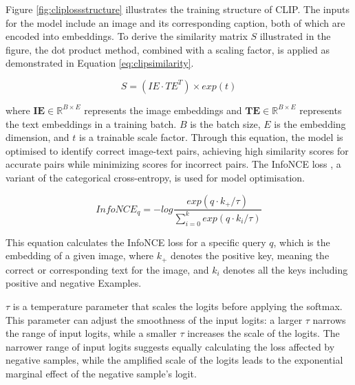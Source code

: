 Figure \ref{fig:cliplossstructure} illustrates the training structure of CLIP. The inputs for the model include an image and its corresponding caption, both of which are encoded into embeddings. To derive the similarity matrix $S$ illustrated in the figure, the dot product method, combined with a scaling factor, is applied as demonstrated in Equation \ref{eq:clipsimilarity}. 

\begin{equation}
    \label{eq:clipsimilarity}
    S = (IE \cdot TE^T) \times exp(t)
\end{equation}

where $\mathbf{IE} \in \mathbb{R}^{B \times E}$ represents the image embeddings and $\mathbf{TE} \in \mathbb{R}^{B \times E}$ represents the text embeddings in a training batch. $B$ is the batch size, $E$ is the embedding dimension, and $t$ is a trainable scale factor. Through this equation, the model is optimised to identify correct image-text pairs, achieving high similarity scores for accurate pairs while minimizing scores for incorrect pairs. The InfoNCE loss \parencite{oord2019representation}, a variant of the categorical cross-entropy, is used for model optimisation.

\begin{equation}
    \label{eq:infonce}
    InfoNCE_q = -log \frac{exp(q \cdot k_+ / \tau)}{\sum_{i=0}^{k}{exp(q \cdot k_i / \tau)}}
\end{equation}

This equation calculates the InfoNCE loss for a specific query $q$, which is the embedding of a given image, where $k_+$ denotes the positive key, meaning the correct or corresponding text for the image, and $k_i$ denotes all the keys including positive and negative Examples. 

$\tau$ is a temperature parameter that scales the logits before applying the softmax. This parameter can adjust the smoothness of the input logits: a larger $\tau$ narrows the range of input logits, while a smaller $\tau$ increases the scale of the logits. The narrower range of input logits suggests equally calculating the loss affected by negative samples, while the amplified scale of the logits leads to the exponential marginal effect of the negative sample's logit.


